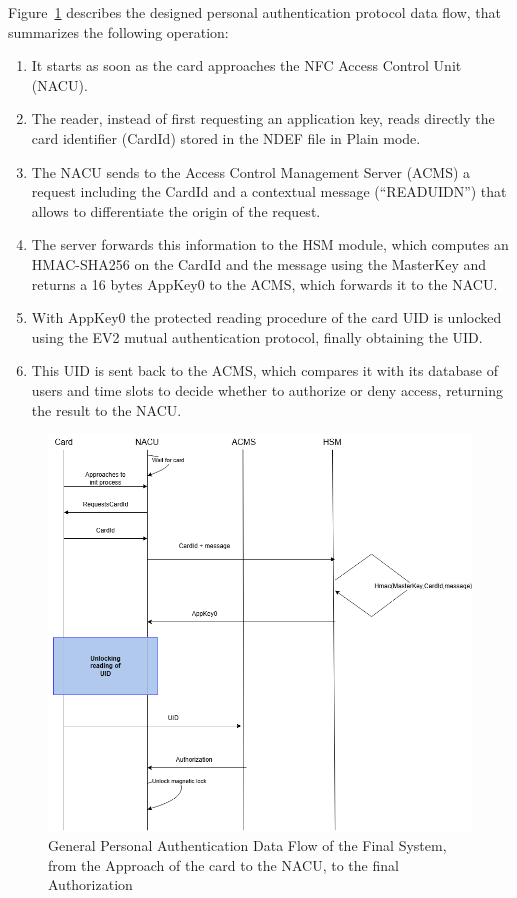 Figure~\ref{fig:flow_auth}  describes the designed personal authentication protocol data flow, that summarizes the following operation:

\begin{enumerate}
	\item It starts as soon as the card approaches the NFC Access Control Unit
	(NACU).
	\item The reader, instead of first requesting an application key, reads directly the card identifier (CardId) stored in the NDEF file in Plain mode.
	\item The NACU sends to the Access Control Management Server (ACMS) a
	request including the CardId and a contextual message (“READUIDN”) that
	allows to differentiate the origin of the request.
	\item The server forwards this information to the HSM module, which computes an
	HMAC-SHA256 on the CardId and the message using the MasterKey and
	returns a 16 bytes AppKey0 to the ACMS, which forwards it to the NACU.
	\item With AppKey0 the protected reading procedure of the card UID is unlocked
	using the EV2 mutual authentication protocol, finally obtaining the UID.
	\item This UID is sent back to the ACMS, which compares it with its database of
	users and time slots to decide whether to authorize or deny access, returning
	the result to the NACU.
\end{enumerate}

\begin{figure}[H]
	\centering
	\includegraphics[width=\textwidth]{imaxes/DataFlow}
	\caption{General Personal Authentication Data Flow of the Final System, from the Approach of the card to the NACU, to the final Authorization}
	\label{fig:flow_auth}
\end{figure}

